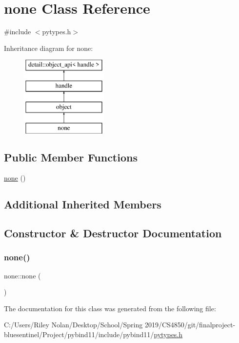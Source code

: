 \hypertarget{classnone}{}\section{none Class Reference}
\label{classnone}


{\ttfamily \#include $<$pytypes.\+h$>$}

Inheritance diagram for none\+:\begin{figure}[H]
\begin{center}
\leavevmode
\includegraphics[height=4.000000cm]{classnone}
\end{center}
\end{figure}
\subsection*{Public Member Functions}
\begin{DoxyCompactItemize}
\item 
\mbox{\hyperlink{classnone_a2b9ad379fe0786f077da548874988f02}{none}} ()
\end{DoxyCompactItemize}
\subsection*{Additional Inherited Members}


\subsection{Constructor \& Destructor Documentation}
\mbox{\label{classnone_a2b9ad379fe0786f077da548874988f02}} 
\subsubsection{\texorpdfstring{none()}{none()}}
{\footnotesize\ttfamily none\+::none (\begin{DoxyParamCaption}{ }\end{DoxyParamCaption})\hspace{0.3cm}{\ttfamily [inline]}}



The documentation for this class was generated from the following file\+:\begin{DoxyCompactItemize}
\item 
C\+:/\+Users/\+Riley Nolan/\+Desktop/\+School/\+Spring 2019/\+C\+S4850/git/finalproject-\/bluesentinel/\+Project/pybind11/include/pybind11/\mbox{\hyperlink{pytypes_8h}{pytypes.\+h}}\end{DoxyCompactItemize}
